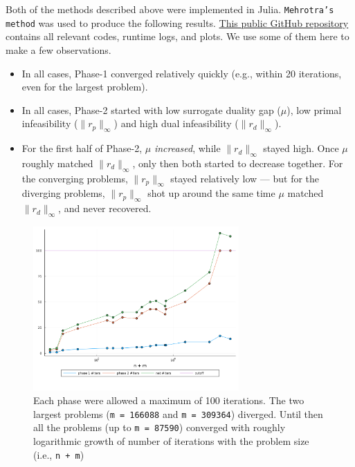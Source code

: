\documentclass[10pt,a4paper]{article}
\begin{document}
Both of the methods described above were implemented in Julia. \texttt{Mehrotra's method} was used to produce the following results. \href{https://github.com/pratyai/ipm}{This public GitHub repository} contains all relevant codes, runtime logs, and plots. We use some of them here to make a few observations.

\begin{itemize}
\item In all cases, Phase-1 converged relatively quickly (e.g., within 20 iterations, even for the largest problem).
\item In all cases, Phase-2 started with low surrogate duality gap ($\mu$), low primal infeasibility ($\|r_p\|_\infty$) and high dual infeasibility ($\|r_d\|_\infty$).
\item For the first half of Phase-2, $\mu$ \emph{increased}, while $\|r_d\|_\infty$ stayed high. Once $\mu$ roughly matched $\|r_d\|_\infty$, only then both started to decrease together. For the converging problems, $\|r_p\|_\infty$ stayed relatively low --- but for the diverging problems, $\|r_p\|_\infty$ shot up around the same time $\mu$ matched $\|r_d\|_\infty$, and never recovered.
\end{itemize}

\begin{figure}[b]
\centering

\includegraphics[width=0.7\textwidth]{plots/logs.png}
\caption{Each phase were allowed a maximum of 100 iterations. The two largest problems (\texttt{m = 166088} and \texttt{m = 309364}) diverged. Until then all the problems (up to \texttt{m = 87590}) converged with roughly logarithmic growth of number of iterations with the problem size (i.e., \texttt{n + m})}
\end{figure}
\end{document}
